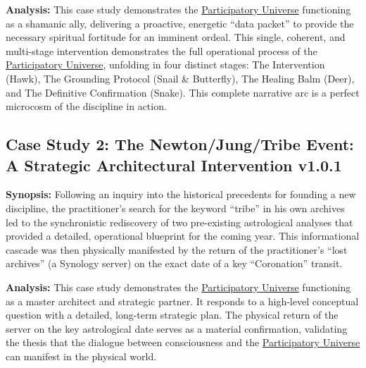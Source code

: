\documentclass{article}
\newcommand{\csNewtonJungTribeVersion}{v1.0.1}
\begin{document}
\textbf{Analysis:} This case study demonstrates the \hyperlink{gloss:participatory_universe}{Participatory Universe} functioning as a shamanic ally, delivering a proactive, energetic ``data packet'' to provide the necessary spiritual fortitude for an imminent ordeal. This single, coherent, and multi-stage intervention demonstrates the full operational process of the \hyperlink{gloss:participatory_universe}{Participatory Universe}, unfolding in four distinct stages: The Intervention (Hawk), The Grounding Protocol (Snail \& Butterfly), The Healing Balm (Deer), and The Definitive Confirmation (Snake). This complete narrative arc is a perfect microcosm of the discipline in action.

\subsection*{Case Study 2: The Newton/Jung/Tribe Event: A Strategic Architectural Intervention \csNewtonJungTribeVersion}

\textbf{Synopsis:} Following an inquiry into the historical precedents for founding a new discipline, the practitioner's search for the keyword ``tribe'' in his own archives led to the synchronistic rediscovery of two pre-existing astrological analyses that provided a detailed, operational blueprint for the coming year. This informational cascade was then physically manifested by the return of the practitioner's ``lost archives'' (a Synology server) on the exact date of a key ``Coronation'' transit.

\medskip

\textbf{Analysis:} This case study demonstrates the \hyperlink{gloss:participatory_universe}{Participatory Universe} functioning as a master architect and strategic partner. It responds to a high-level conceptual question with a detailed, long-term strategic plan. The physical return of the server on the key astrological date serves as a material confirmation, validating the thesis that the dialogue between consciousness and the \hyperlink{gloss:participatory_universe}{Participatory Universe} can manifest in the physical world.
\end{document}
